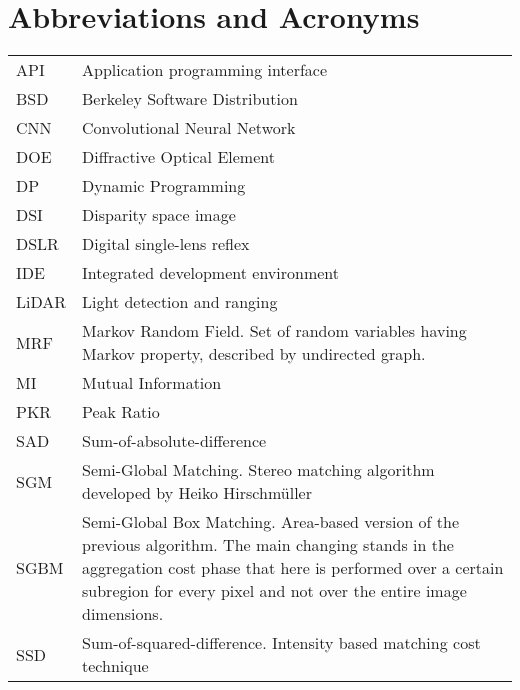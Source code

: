 \chapter*{Abbreviations and Acronyms}


\noindent
\begin{longtable}{@{}p{}p{}@{}}
API & Application programming interface \\
BSD & Berkeley Software Distribution \\
CNN & Convolutional Neural Network \\
DOE & Diffractive Optical Element \\
DP & Dynamic Programming \\
DSI & Disparity space image \\
DSLR & Digital single-lens reflex \\
IDE & Integrated development environment \\
LiDAR & Light detection and ranging \\
MRF & Markov Random Field. Set of random variables having Markov property, described by undirected graph. \\ 
MI & Mutual Information \\
PKR & Peak Ratio \\
SAD & Sum-of-absolute-difference \\
SGM & Semi-Global Matching. Stereo matching algorithm developed by Heiko Hirschm\"{u}ller \\
SGBM & Semi-Global Box Matching. Area-based version of the previous algorithm. The main changing stands in the aggregation cost phase that here is performed over a certain subregion for every pixel and not over the entire image dimensions.\\
SSD & Sum-of-squared-difference. Intensity based matching cost technique\\
\end{longtable}
